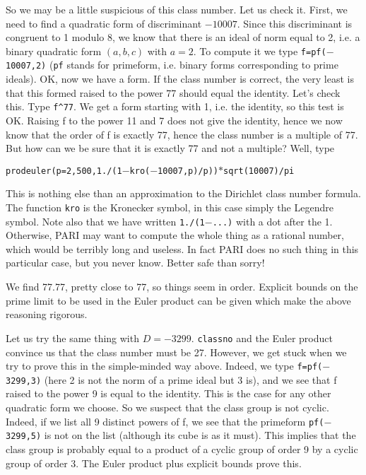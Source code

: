 So we may be a little suspicious of this class number. Let us check it.
First, we need to find a quadratic form of discriminant $-10007$. Since this
discriminant is congruent to 1 modulo 8, we know that there is an ideal of 
norm equal to 2, i.e. a binary quadratic form $(a,b,c)$ with $a=2$. To compute it
we type {\tt f=pf($-$10007,2)} ({\tt pf} stands for primeform, i.e. binary forms
corresponding to prime ideals). OK, now we have a form. If the class
number is correct, the very least is that this formed raised to the
power 77 should equal the identity. Let's check this.
Type {\tt f\^{}77}. We get a form starting
with 1, i.e. the identity, so this test is OK. Raising f to the power 11 and 7
does not give the identity, hence we now know that the order of f is exactly
77, hence the class number is a multiple of 77. But how can we be sure that
it is exactly 77 and not a multiple? Well, type

\centerline{\tt prodeuler(p=2,500,1./(1$-$kro($-$10007,p)/p))$*$sqrt(10007)/pi}

This is nothing else than an approximation to the Dirichlet class number
formula. The function {\tt kro} is the Kronecker symbol, in this case simply
the Legendre symbol. Note also that we have written {\tt 1./(1$-$...)} with
a dot after the 1. Otherwise, PARI may want to compute the whole thing as
a rational number, which would be terribly long and useless. In fact PARI
does no such thing in this particular case, but you never know. Better safe
than sorry!

We find 77.77, pretty close to 77, so things seem in order. Explicit bounds
on the prime limit to be used in the Euler product can be given which make
the above reasoning rigorous.

Let us try the same thing with $D=-3299$. {\tt classno} and the Euler product
convince us that the class number must be 27. However, we get stuck when we try
to prove this in the simple-minded way above. Indeed, we type
{\tt f=pf($-$3299,3)} (here 2 is not the norm of a prime ideal but 3 is), and
we see that f raised to the power 9 is equal to the identity. This is the
case for any other quadratic form we choose. So we suspect that the class
group is not cyclic. Indeed, if we list all 9 distinct powers of f, we see
that the primeform {\tt pf($-$3299,5)} is not on the list (although its cube
is as it must). This implies that the class group is probably equal to a
product of a cyclic group of order 9 by a cyclic group of order 3. The
Euler product plus explicit bounds prove this.

